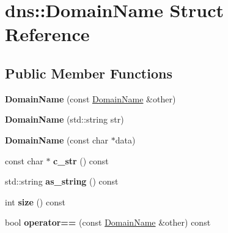 \hypertarget{structdns_1_1DomainName}{}\section{dns\+:\+:Domain\+Name Struct Reference}
\label{structdns_1_1DomainName}
\subsection*{Public Member Functions}
\begin{DoxyCompactItemize}
\item 
{\bfseries Domain\+Name} (const \hyperlink{structdns_1_1DomainName}{Domain\+Name} \&other)\hypertarget{structdns_1_1DomainName_ad60b6906c878a459d90e581e38a14b88}{}\label{structdns_1_1DomainName_ad60b6906c878a459d90e581e38a14b88}

\item 
{\bfseries Domain\+Name} (std\+::string str)\hypertarget{structdns_1_1DomainName_ae5672debce76216a4fdc132d2f793f7d}{}\label{structdns_1_1DomainName_ae5672debce76216a4fdc132d2f793f7d}

\item 
{\bfseries Domain\+Name} (const char $\ast$data)\hypertarget{structdns_1_1DomainName_ae4dfa596bfe1f9a2ee9aa7d6a08a1288}{}\label{structdns_1_1DomainName_ae4dfa596bfe1f9a2ee9aa7d6a08a1288}

\item 
const char $\ast$ {\bfseries c\+\_\+str} () const \hypertarget{structdns_1_1DomainName_ae02a0ca9015d761bbea80711d18f4bf6}{}\label{structdns_1_1DomainName_ae02a0ca9015d761bbea80711d18f4bf6}

\item 
std\+::string {\bfseries as\+\_\+string} () const \hypertarget{structdns_1_1DomainName_a139b1cb39d27b693f7662698e865536d}{}\label{structdns_1_1DomainName_a139b1cb39d27b693f7662698e865536d}

\item 
int {\bfseries size} () const \hypertarget{structdns_1_1DomainName_a894ccfcd88ac1ad2425b2bfe9ce826a6}{}\label{structdns_1_1DomainName_a894ccfcd88ac1ad2425b2bfe9ce826a6}

\item 
bool {\bfseries operator==} (const \hyperlink{structdns_1_1DomainName}{Domain\+Name} \&other) const \hypertarget{structdns_1_1DomainName_a3c69c68df68eff0fa0f5009958119ba6}{}\label{structdns_1_1DomainName_a3c69c68df68eff0fa0f5009958119ba6}

\end{DoxyCompactItemize}
